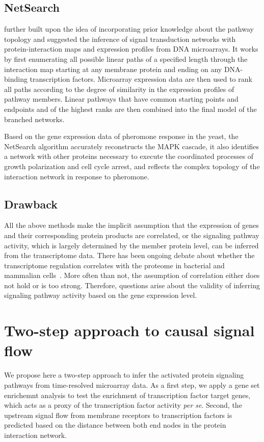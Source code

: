 \subsection{NetSearch}
\cite{Steffen2002} further built upon the idea of incorporating 
prior knowledge about the pathway topology and suggested
the inference of signal transduction networks with protein-interaction maps
and expression profiles from DNA microarrays.
It works by first enumerating all possible linear paths
of a specified length through the interaction map starting
at any membrane protein and ending on any DNA-binding
transcription factors.
Microarray expression data are then used
to rank all paths according to the degree of similarity in
the expression profiles of pathway members.
Linear pathways
that have common starting points and endpoints
and of the highest ranks are then combined into the final
model of the branched networks.

Based on the gene expression data of pheromone response in the yeast, the 
NetSearch algorithm accurately reconstructs the MAPK cascade, it also identifies a 
network with other proteins necessary to execute the coordinated processes of 
growth polarization and cell cycle arrest, and reflects the complex topology of 
the interaction network in response to pheromone.

\subsection{Drawback}
All the above methods make the implicit assumption that the expression of genes
and their corresponding protein products are correlated, or the signaling 
pathway activity, which is largely determined by the member protein level, 
can be inferred from the transcriptome data. There has been ongoing debate 
about whether the transcriptome regulation correlates with the proteome
in bacterial and mammalian cells~\citep{Taniguchi2010,Ghazalpour2011}. More
often than not, the assumption of correlation either does not hold or is too 
strong. Therefore, questions arise about the validity of inferring signaling 
pathway activity based on the gene expression level.

\section{Two-step approach to causal signal flow}
We propose here a two-step approach to infer the activated protein signaling
pathways from time-resolved microarray data. As a first step, we apply a
gene set enrichemnt analysis to test the
enrichment of transcription factor target genes, which acts as a proxy of
the transcription factor activity \emph{per se}. Second, the upstream 
signal flow from membrane receptors to transcription factors is predicted 
based on the distance between both end nodes in the protein interaction
network.

